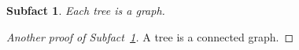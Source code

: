\documentclass{article}
\newtheorem{subfact}{Subfact}
\begin{document}
\begin{subfact}\label{sf} Each tree is a graph. \end{subfact}
\begin{proof}[Another proof of Subfact~\ref{sf}] A tree is a connected graph. \end{proof}
\end{document}
